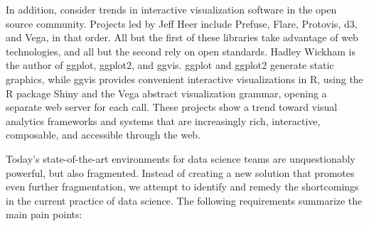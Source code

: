 In addition, consider trends in interactive visualization software
in the open source community.  Projects led by Jeff Heer
include Prefuse, Flare, Protovis, d3, and Vega, in that order.
All but the first of these libraries take advantage of web technologies,
and all but the second rely on open standards. Hadley Wickham is the
author of ggplot, ggplot2, and ggvis. ggplot and ggplot2 generate
static graphics, while ggvis provides convenient interactive visualizations
in R, using the R package Shiny and the Vega abstract visualization grammar,
opening a separate web server for each call. These projects show
a trend toward visual analytics frameworks and systems that are
increasingly rich, interactive, composable, and accessible through the web.




Today's state-of-the-art environments for data science teams are unquestionably
powerful, but also fragmented. Instead of creating a new solution that promotes
even further fragmentation, we attempt to identify and remedy the shortcomings
in the current practice of data science. The following requirements summarize
the main pain points:

